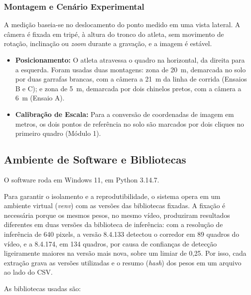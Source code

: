 \documentclass[
    12pt,               %
    openright,          %
    twoside,            %
    a4paper,            %
    chapter=TITLE,      %
    english,            %
    brazil              %
    ]{abntex2}
\begin{document}
\subsubsection{Montagem e Cenário Experimental}
A medição baseia-se no deslocamento do ponto medido em uma vista lateral. A câmera é fixada em tripé, à altura do tronco do atleta, sem movimento de rotação, inclinação ou \textit{zoom} durante a gravação, e a imagem é estável.

\begin{itemize}
    \item \textbf{Posicionamento:} O atleta atravessa o quadro na horizontal, da direita para a esquerda. Foram usadas duas montagens: zona de 20~m, demarcada no solo por duas garrafas brancas, com a câmera a 21~m da linha de corrida (Ensaios B e C); e zona de 5~m, demarcada por dois chinelos pretos, com a câmera a 6~m (Ensaio A).
    \item \textbf{Calibração de Escala:} Para a conversão de coordenadas de imagem em metros, os dois pontos de referência no solo são marcados por dois cliques no primeiro quadro (Módulo 1).
\end{itemize}

\subsection{Ambiente de Software e Bibliotecas}

O software roda em Windows 11, em Python 3.14.7.

Para garantir o isolamento e a reprodutibilidade, o sistema opera em um ambiente virtual (\textit{venv}) com as versões das bibliotecas fixadas. A fixação é necessária porque os mesmos pesos, no mesmo vídeo, produziram resultados diferentes em duas versões da biblioteca de inferência: com a resolução de inferência de 640 pixels, a versão 8.4.133 detectou o corredor em 89 quadros do vídeo, e a 8.4.174, em 134 quadros, por causa de confianças de detecção ligeiramente maiores na versão mais nova, sobre um limiar de 0,25. Por isso, cada extração grava as versões utilizadas e o resumo (\textit{hash}) dos pesos em um arquivo ao lado do CSV.

As bibliotecas usadas são:
\end{document}
